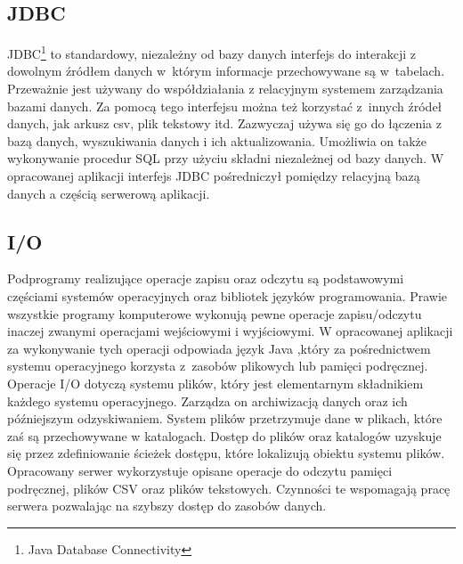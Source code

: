 \documentclass[12pt, twoside]{report}
\begin{document}

\subsection{JDBC}
JDBC\footnote{Java Database Connectivity} to standardowy, niezależny od bazy danych interfejs do interakcji z dowolnym źródłem danych w~którym informacje przechowywane są w~tabelach. Przeważnie jest używany do współdziałania z relacyjnym systemem zarządzania bazami danych. Za pomocą tego interfejsu można też korzystać z~innych źródeł danych, jak arkusz csv, plik tekstowy itd. Zazwyczaj używa się go do łączenia z bazą danych, wyszukiwania danych i ich aktualizowania. Umożliwia on także wykonywanie procedur SQL przy użyciu składni niezależnej od bazy danych\cite{jdbc}. W opracowanej aplikacji interfejs JDBC pośredniczył pomiędzy relacyjną bazą danych a częścią serwerową aplikacji.


\subsection{I/O}
Podprogramy realizujące operacje zapisu oraz odczytu są podstawowymi częściami systemów operacyjnych oraz bibliotek języków programowania. Prawie wszystkie programy komputerowe wykonują pewne operacje zapisu/odczytu inaczej zwanymi operacjami wejściowymi i wyjściowymi. W opracowanej aplikacji za wykonywanie tych operacji odpowiada język Java ,który za pośrednictwem systemu operacyjnego korzysta z~zasobów plikowych lub pamięci podręcznej. Operacje I/O dotyczą systemu plików, który jest elementarnym składnikiem każdego systemu operacyjnego. Zarządza on archiwizacją danych oraz ich późniejszym odzyskiwaniem. System plików przetrzymuje dane w plikach, które zaś są przechowywane w katalogach. Dostęp do plików oraz katalogów uzyskuje się przez zdefiniowanie ścieżek dostępu, które lokalizują obiektu systemu plików.\cite{i/o}
Opracowany serwer wykorzystuje opisane operacje do odczytu pamięci podręcznej, plików CSV oraz plików tekstowych. Czynności te wspomagają pracę serwera pozwalając na szybszy dostęp do zasobów danych.
\end{document}
